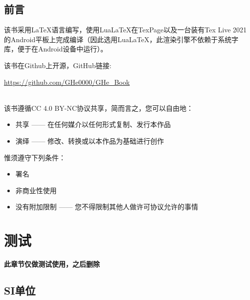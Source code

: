 \documentclass{gbook}
\begin{document}
 

\newpage

\section{前言}

该书采用\LaTeX 语言编写，使用Lua\LaTeX 在TexPage以及一台装有Tex Live 2021的Android平板上完成编译（因此选用Lua\LaTeX，此渲染引擎不依赖于系统字库，便于在Android设备中运行）。
~\\

\begin{minipage}[b]{0.6\linewidth}
该书在Github上开源，GitHub链接:

\url{https://github.com/GHe0000/GHe_Book} 
\end{minipage}
\hfill
\begin{minipage}[b]{0.1\linewidth}
\end{minipage}
~\\

该书遵循CC 4.0 BY-NC协议共享，简而言之，您可以自由地：
\begin{itemize}
    \item 共享 —— 在任何媒介以任何形式复制、发行本作品
    \item 演绎 —— 修改、转换或以本作品为基础进行创作
\end{itemize}

惟须遵守下列条件：
\begin{itemize}
    \item 署名
    \item 非商业性使用
    \item 没有附加限制 —— 您不得限制其他人做许可协议允许的事情
\end{itemize}


\tableofcontents

\setcounter{page}{0}

\newpage


\chapter{测试}

\textbf{此章节仅做测试使用，之后删除}

\section{SI单位}
\end{document}
